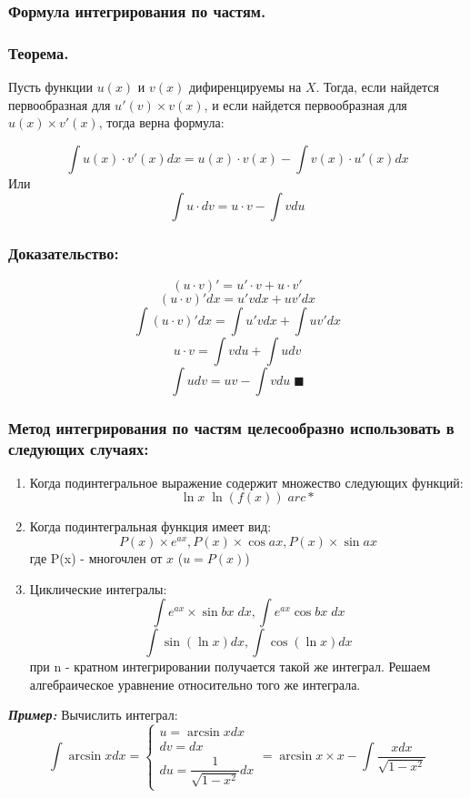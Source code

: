 \documentclass[a4paper,12pt]{article}
\theoremstyle{plain} %
\theoremstyle{definition} %
\theoremstyle{remark} %
\begin{document}
\subsubsection*{Формула интегрирования по частям.}

\subsubsection*{Теорема.}
Пусть функции $u(x)$ и $v(x)$ дифиренцируемы на $X$. Тогда, если найдется первообразная для $u'(v) \times v(x)$, и если найдется первообразная для $u(x) \times v'(x)$, тогда верна формула:

\[
	\int u(x) \cdot v'(x) dx = u(x) \cdot v(x) - \int v(x) \cdot u'(x) dx
\]
Или
\[
	\int u \cdot dv = u \cdot v - \int v du
\]

\subsubsection*{Доказательство:}
\[ (u\cdot v)' = u' \cdot v + u \cdot v' \]
\[ (u \cdot v)' dx = u' v dx + u v' dx      \]
\[ \int (u \cdot v)'dx = \int u' v dx + \int u v' dx \]
\[ u \cdot v = \int v du + \int u dv \]
\[ \int u dv = u v - \int v du \; \blacksquare\]

\subsubsection*{Метод интегрирования по частям целесообразно использовать в следующих случаях:}

\begin{enumerate}
	\item Когда подинтегральное выражение содержит множество следующих функций:
	      \[ \ln{x} \; \ln{(f(x))} \; arc* \]
	\item Когда подинтегральная функция имеет вид:
	      \[ P(x) \times e^{ax}, P(x) \times \cos{ax}, P(x) \times \sin{ax} \]
	      где P(x) - многочлен от $x$ ($u = P(x)$)
	\item Циклические интегралы:
	      \[ \int e^{ax} \times \sin{bx} \; dx, \int e^{ax} \cos{bx} \; dx \]
	      \[ \int \sin{(\ln{x})} dx, \int \cos{(\ln{x})} dx \]
	      при n - кратном интегрировании получается такой же интеграл. Решаем алгебраическое уравнение относительно того же интеграла.
\end{enumerate}

\textit{\textbf{Пример:}} Вычислить интеграл:
\[ \int \arcsin{x} dx =
	\begin{cases}
		u = \arcsin{x} dx \\
		dv = dx           \\
		du = \dfrac{1}{\sqrt{1 - x^2}} dx
	\end{cases} = \arcsin{x} \times x - \int \frac{xdx}{\sqrt{1 - x^2}}
\]
\end{document}
